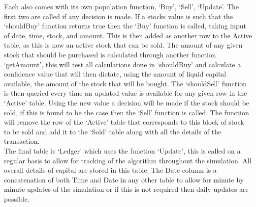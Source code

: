 \documentclass[12pt,a4paper]{article}
\begin{document}
Each also comes with its own population function, `Buy', `Sell', `Update'. The first two are called if any decision is made. If a stocks value is such that the `shouldBuy' function returns true then the `Buy' function is called, taking input of date, time, stock, and amount. This is then added as another row to the Active table, as this is now an active stock that can be sold. The amount of any given stock that should be purchased is calculated through another function `getAmount', this will test all calculations done in `shouldBuy' and calculate a confidence value that will then dictate, using the amount of liquid capital available, the amount of the stock that will be bought. The `shouldSell' function is then queried every time an updated value is available for any given row in the `Active' table. Using the new value a decision will be made if the stock should be sold, if this is found to be the case then the `Sell' function is called. The function will remove the row of the `Active' table that corresponds to this block of stock to be sold and add it to the `Sold' table along with all the details of the transaction. \\

The final table is `Ledger' which uses the function `Update', this is called on a regular basis to allow for tracking of the algorithm throughout the simulation. All overall details of capital are stored in this table. The Date column is a concatenation of both Time and Date in any other table to allow for minute by minute updates of the simulation or if this is not required then daily updates are possible.
\end{document}
